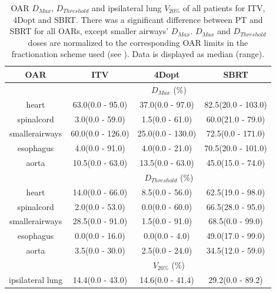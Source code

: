 \documentclass[type=dr, dr=rernat, accentcolor=tud7b,colorbacktitle, bigchapter, openright, twoside, 12pt ]{tudthesis}
\begin{document}
\begin{table}[H]
	\centering
	\caption{OAR $D_{Max}$, $D_{Threshold}$ and ipsilateral lung $V_{20\%}$ of all patients for ITV, 4Dopt and SBRT. There was a significant difference between PT and SBRT for all OARs, except
	smaller airways' $D_{Max}$. $D_{Max}$ and $D_{Threshold}$ doses are normalized to the corresponding OAR limits in the fractionation scheme used (see \cite{Benedict2010}). 
	Data is displayed as median (range).}
	\begin{tabular}{c|c|c|c}
		\hline\hline
		 
		OAR &  ITV & 4Dopt & SBRT \\
		\hline
		& \multicolumn{3}{c}{$D_{Max}$ (\%)}  \\
		\hline
heart & 63.0(0.0 - 95.0) & 37.0(0.0 - 97.0) & 82.5(20.0 - 103.0)\\ 
spinalcord & 3.0(0.0 - 59.0) & 1.5(0.0 - 61.0) & 60.0(21.0 - 79.0)\\ 
smallerairways & 60.0(0.0 - 126.0) & 25.0(0.0 - 130.0) & 72.5(0.0 - 171.0)\\ 
esophagus & 4.0(0.0 - 91.0) & 4.0(0.0 - 21.0) & 70.5(20.0 - 101.0)\\ 
aorta & 10.5(0.0 - 63.0) & 13.5(0.0 - 63.0) & 45.0(15.0 - 74.0)\\
\hline\hline
& \multicolumn{3}{c}{$D_{Threshold}$ (\%)} \\
\hline
heart & 14.0(0.0 - 66.0) & 8.5(0.0 - 56.0) & 62.5(19.0 - 98.0)\\ 
spinalcord & 2.0(0.0 - 53.0) & 0.0(0.0 - 60.0) & 66.5(28.0 - 95.0)\\ 
smallerairways & 28.5(0.0 - 91.0) & 1.5(0.0 - 91.0) & 68.5(0.0 - 99.0)\\ 
esophagus & 0.0(0.0 - 16.0) & 0.0(0.0 - 4.0) & 49.0(17.0 - 99.0)\\ 
aorta & 3.5(0.0 - 30.0) & 2.5(0.0 - 24.0) & 34.5(12.0 - 59.0)\\ 
\hline\hline
& \multicolumn{3}{c}{$V_{20\%}$ (\%)} \\
\hline
ipsilateral lung & 14.4(0.0 - 43.0) & 14.6(0.0 - 41.4) & 29.2(0.0 - 89.2)\\
\hline\hline
	\end{tabular}
	\label{tab:OARComplex}
\end{table}
\end{document}
